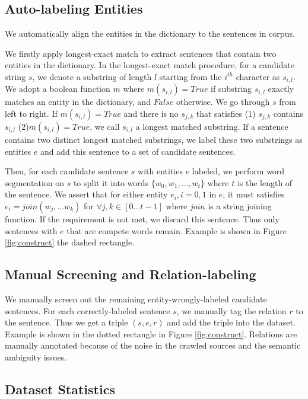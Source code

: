 \subsection{Auto-labeling Entities}
We automatically align the entities in the dictionary to the sentences in corpus.

We firstly apply longest-exact match to extract sentences that contain two entities in the dictionary. In the longest-exact match procedure, for a candidate string $s$, we denote a substring of length $l$ starting from the $i^{th}$ character as $s_{i,l}$. We adopt a boolean function $m$ where $m(s_{i,l})=True$ if substring $s_{i,l}$ exactly matches an entity in the dictionary, and $False$ otherwise. We go through $s$ from left to right. If $m(s_{i,l})=True$ and there is no $s_{j,k}$ that satisfies (1) $s_{j,k}$ contains $s_{i,l}$ (2)$m(s_{i,l})=True$, we call $s_{i,l}$ a longest matched substring. If a sentence contains two distinct longest matched substrings, we label these two substrings as entities $e$ and add this sentence to a set of candidate sentences.

Then, for each candidate sentence $s$ with entities $e$ labeled, we perform word segmentation on $s$ to split it into words $\{w_0,w_1,...,w_t\}$ where $t$ is the length of the sentence. We assert that for either entity $e_i,i=0,1$ in $e$, it must satisfies $e_i=join(w_j,...w_k)$ for $\forall j,k \in [0...t-1]$ where $join$ is a string joining function. If the requirement is not met, we discard this sentence. Thus only sentences with $e$ that are compete words remain. Example is shown in Figure \ref{fig:construct} the dashed rectangle.
\subsection{Manual Screening and Relation-labeling}
We manually screen out the remaining entity-wrongly-labeled candidate sentences. For each correctly-labeled sentence $s$, we manually tag the relation $r$ to the sentence. Thus we get a triple $(s,e,r)$ and add the triple into the dataset. Example is shown in the dotted rectangle in Figure \ref{fig:construct}.
Relations are manually annotated because of the noise in the crawled sources and the semantic ambiguity issues.
\subsection{Dataset Statistics}


